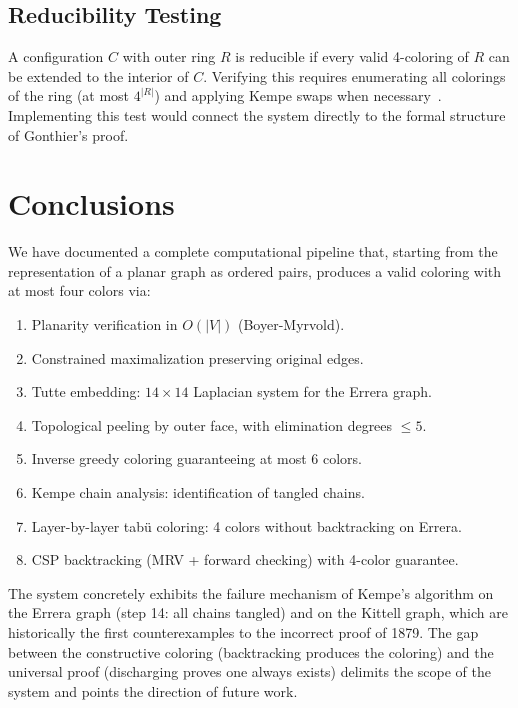 \documentclass[12pt,letterpaper]{article}
\theoremstyle{plain}
\theoremstyle{definition}
\theoremstyle{remark}
\begin{document}
\subsection{Reducibility Testing}

A configuration $C$ with outer ring $R$ is reducible if every valid 4-coloring
of $R$ can be extended to the interior of $C$. Verifying this requires
enumerating all colorings of the ring (at most $4^{|R|}$) and applying Kempe
swaps when necessary~\cite{robertson1997}. Implementing this test would connect
the system directly to the formal structure of Gonthier's proof.

\section{Conclusions}

We have documented a complete computational pipeline that, starting from the
representation of a planar graph as ordered pairs, produces a valid coloring
with at most four colors via:

\begin{enumerate}[noitemsep]
    \item Planarity verification in $O(|V|)$ (Boyer-Myrvold).
    \item Constrained maximalization preserving original edges.
    \item Tutte embedding: $14 \times 14$ Laplacian system for the Errera graph.
    \item Topological peeling by outer face, with elimination degrees $\leq 5$.
    \item Inverse greedy coloring guaranteeing at most 6 colors.
    \item Kempe chain analysis: identification of tangled chains.
    \item Layer-by-layer tab\"{u} coloring: 4 colors without backtracking on Errera.
    \item CSP backtracking (MRV + forward checking) with 4-color guarantee.
\end{enumerate}

The system concretely exhibits the failure mechanism of Kempe's algorithm on the
Errera graph (step 14: all chains tangled) and on the Kittell graph, which are
historically the first counterexamples to the incorrect proof of 1879. The gap
between the constructive coloring (backtracking produces the coloring) and the
universal proof (discharging proves one always exists) delimits the scope of the
system and points the direction of future work.
\end{document}
